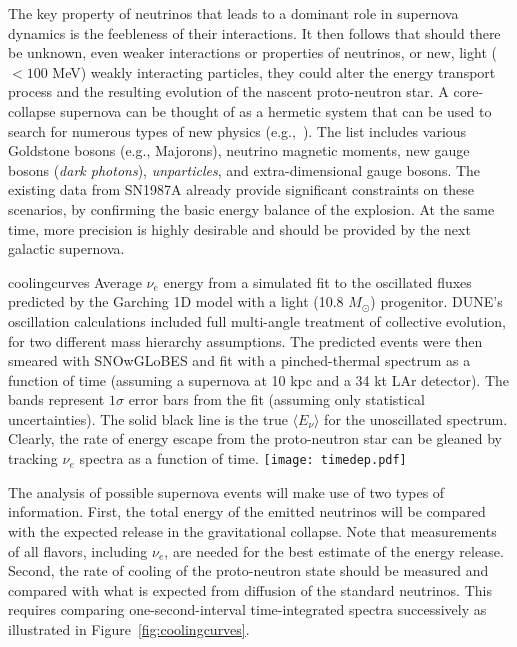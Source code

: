 The key property of neutrinos that leads to a dominant role in supernova dynamics is the feebleness of their interactions. It then follows that should there be unknown, even weaker interactions or properties of neutrinos, or 
new, light ($< 100$ MeV) weakly interacting particles, they could alter the energy transport process and the resulting evolution of the nascent proto-neutron star. 
A core-collapse supernova can be thought of as %
a hermetic system that can be used to search for numerous types of new physics (e.g.,~\cite{Schramm:1990pf,Raffelt:1999tx}). The list includes various Goldstone bosons (e.g., Majorons), neutrino magnetic moments, new gauge bosons (\emph{dark photons}), \emph{unparticles}, and extra-dimensional gauge bosons. %
The existing data from SN1987A already provide significant constraints on these scenarios, by confirming the basic energy balance of the explosion. At the same time, more precision is highly desirable and should be provided by the next galactic supernova. 

\begin{cdrfigure}{coolingcurves}{ Average $\nu_{e}$ energy from a simulated fit to the oscillated fluxes predicted by the Garching 1D model with a light (10.8 $M_{\odot}$) progenitor. DUNE's oscillation calculations included full multi-angle treatment of collective evolution, for two
different mass hierarchy assumptions. The predicted events were then smeared with SNOwGLoBES and fit with a pinched-thermal spectrum as a function of time (assuming a supernova at 10 kpc and a 34 kt LAr detector). The bands represent $1\sigma$ error bars from the fit (assuming only statistical uncertainties). The solid black line is the true
$\langle E_{\nu} \rangle$ for the unoscillated spectrum. Clearly, the rate of energy escape from the proto-neutron star can be gleaned by tracking $\nu_{e}$ spectra as a function of time.}
\texttt{[image: timedep.pdf]}
\end{cdrfigure}


The analysis of possible supernova events will make use of two types of information. First, the total energy of the emitted neutrinos will be compared with the expected release in the gravitational collapse.  Note that measurements of all flavors, including $\nu_e$, are needed for the best estimate of the energy release.
Second, the rate of cooling of the proto-neutron state should be measured and compared with what is expected from diffusion of the standard neutrinos. This requires comparing one-second-interval time-integrated spectra successively %
as illustrated in Figure~\ref{fig:coolingcurves}. 

